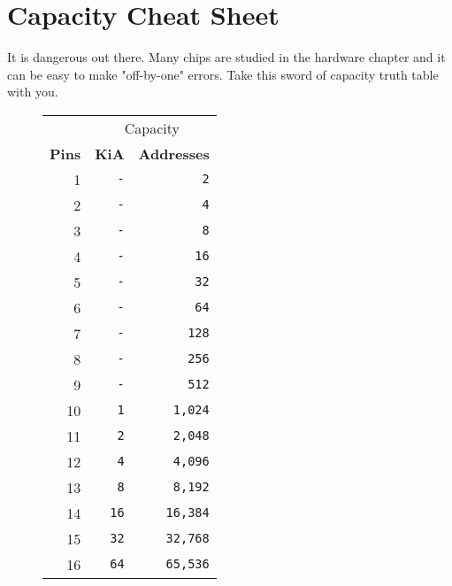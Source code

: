 \chapter*{Capacity Cheat Sheet}
It is dangerous out there. Many chips are studied in the hardware chapter and it can be easy to make "off-by-one" errors. 
Take this sword of capacity truth table with you.


\begin{figure}[H]
\begin{minipage}[t]{0.49\linewidth}
{ 
\setlength{\tabcolsep}{3.0pt}
\setlength\cmidrulewidth{\heavyrulewidth} %
\begin{tabular}{rrr}

  & \multicolumn{2}{c}{Capacity} \\
  \cmidrule(lr){2-3}
  
 
  \textbf{Pins} & \textbf{KiA} & \textbf{Addresses}\\               
            
  \toprule    
1            &    \texttt{-} &      \texttt{2}   \\
2   &\texttt{-}            &      \texttt{4}   \\
3  &    \texttt{-} &      \texttt{8}   \\
4  &\texttt{-}            &      \texttt{16}   \\
5  &    \texttt{-} &      \texttt{32}   \\
6   &    \texttt{-} &      \texttt{64}   \\
7   &    \texttt{-} &      \texttt{128}   \\
8            &    \texttt{-} &      \texttt{256}   \\
9           &    \texttt{-} &      \texttt{512}   \\
10   &    \texttt{1}           &      \texttt{1,024} \\
11   &    \texttt{2}           &\texttt{2,048}    \\
12   &    \texttt{4}           &      \texttt{4,096} \\
13   &    \texttt{8}          &      \texttt{8,192} \\
14            &    \texttt{16}           &      \texttt{16,384} \\
15  &    \texttt{32}           &\texttt{32,768}    \\
  16  &    \texttt{64}           &\texttt{65,536}    \\

  \toprule    
\end{tabular}%
}
\end{minipage}%
\begin{minipage}[t]{0.49\linewidth}
{ 
\setlength{\tabcolsep}{3.0pt}
\setlength\cmidrulewidth{\heavyrulewidth} %
\begin{tabular}{rrr}


\end{tabular}}
\end{minipage}
\end{figure}
